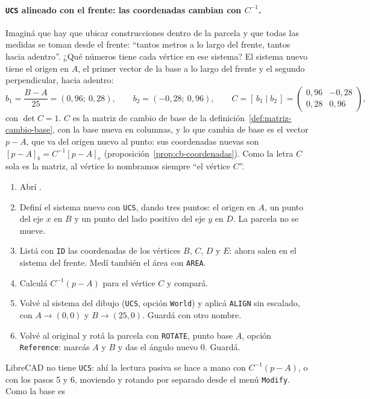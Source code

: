 \paragraph{\texttt{UCS} alineado con el frente: las coordenadas cambian con \(C^{-1}\).}
Imaginá que hay que ubicar construcciones dentro de la parcela y que todas las medidas se toman
desde el frente: \enquote{tantos metros a lo largo del frente, tantos hacia adentro}. ¿Qué
números tiene cada vértice en ese sistema? El sistema nuevo tiene el origen en \(A\), el primer
vector de la base a lo largo del frente y el segundo perpendicular, hacia adentro:
\[
  b_1=\frac{B-A}{25}=(0{,}96;\ 0{,}28),\qquad b_2=(-0{,}28;\ 0{,}96),\qquad
  C=[\,b_1\mid b_2\,]=\begin{pmatrix}0{,}96&-0{,}28\\0{,}28&0{,}96\end{pmatrix},
\]
con \(\det C=1\). \(C\) es la matriz de cambio de base de la
definición~\ref{def:matriz-cambio-base}, con la base nueva en columnas, y lo que cambia de base
es el vector \(p-A\), que va del origen nuevo al punto: sus coordenadas nuevas son
\([p-A]_b=C^{-1}[p-A]_e\) (proposición~\ref{prop:cb-coordenadas}). Como la letra \(C\)
sola es la matriz, al vértice lo nombramos siempre \enquote{el vértice \(C\)}.
\begin{enumerate}
  \item Abrí .
  \item Definí el sistema nuevo con \texttt{UCS}, dando tres puntos: el origen en \(A\), un punto
  del eje \(x\) en \(B\) y un punto del lado positivo del eje \(y\) en \(D\). La parcela no se
  mueve.
  \item Listá con \texttt{ID} las coordenadas de los vértices \(B\), \(C\), \(D\) y \(E\): ahora salen en el
  sistema del frente. Medí también el área con \texttt{AREA}.
  \item Calculá \(C^{-1}(p-A)\) para el vértice \(C\) y compará.
  \item Volvé al sistema del dibujo (\texttt{UCS}, opción \texttt{World}) y aplicá
  \texttt{ALIGN} sin escalado, con \(A\to(0,0)\) y \(B\to(25,0)\). Guardá con otro nombre.
  \item Volvé al original y rotá la parcela con \texttt{ROTATE}, punto base \(A\), opción
  \texttt{Reference}: marcás \(A\) y \(B\) y das el ángulo nuevo \(0\). Guardá.
\end{enumerate}
LibreCAD no tiene \texttt{UCS}: ahí la lectura pasiva se hace a mano con \(C^{-1}(p-A)\), o con
los pasos 5 y 6, moviendo y rotando por separado desde el menú \texttt{Modify}. Como la base es
